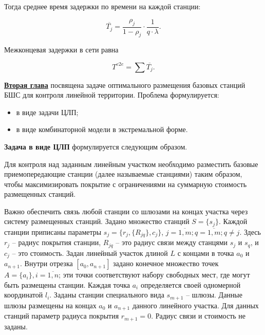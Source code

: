 Тогда среднее время задержки по времени на каждой станции:

\begin{displaymath}
    \overline{T_j} = \frac{\rho_j}{1 - \rho_j} \cdot \frac{1}{q \cdot \lambda}.
\end{displaymath}

Межконцевая задержки в сети равна

\begin{equation}
    \label{eq:end_to_end_delay}
    T^{e2e}= \sum{\overline{T_j}}.
\end{equation}



  




\underline{\textbf{Вторая глава}} посвящена задаче оптимального размещения базовых станций БШС для контроля линейной территории. Проблема формулируется: 
\begin{itemize}
    \item в виде задачи ЦЛП;
    \item в виде комбинаторной модели в экстремальной форме.
\end{itemize}

\textbf{Задача в виде ЦЛП} формулируется следующим образом. 

Для контроля над заданным линейным участком необходимо разместить базовые приемопередающие станции (далее называемые станциями) таким образом, чтобы максимизировать покрытие с ограничениями на суммарную стоимость размещенных станций.


Важно обеспечить связь любой станции со шлюзами на концах участка через систему размещенных станций. Задано множество станций $S = \{s_j\}$. Каждой станции приписаны параметры $s_j = \{r_j, \{R_{jq}\}, c_j \}$, $j = \overline{1,m}; q = \overline{1,m}; q \neq j$. Здесь $r_j$ -- радиус покрытия станции, $R_{jq}$ -- это радиус связи между станцями $s_j$ и $s_q$, и $c_j$ -- это стоимость. Задан линейный участок длиной $L$ с концами в точка $a_0$ и $a_{n+1}$. Внутри  отрезка $[a_0, a_{n+1}]$ задано конечное множество точек $A=\{a_i\}, i=\overline{1,n}$; эти точки соответствуют набору свободных мест, где могут быть размещены станции. Каждая точка $a_i$ определяется своей одномерной координатой $l_i$. Заданы станции специального вида $s_{m+1}$ -- шлюзы. Данные шлюзы размещены на концах $a_0$ и $a_{n+1}$ данного линейного участка. Для данных станций параметр радиуса покрытия $r_{m+1}=0$. Радиус связи и стоимость не заданы.

